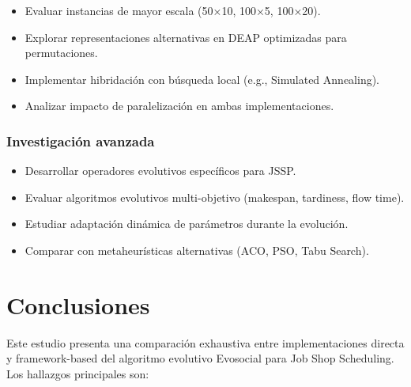 \documentclass[12pt,a4paper]{article}
\begin{document}
\begin{itemize}
    \item Evaluar instancias de mayor escala (50×10, 100×5, 100×20).
    \item Explorar representaciones alternativas en DEAP optimizadas para permutaciones.
    \item Implementar hibridación con búsqueda local (e.g., Simulated Annealing).
    \item Analizar impacto de paralelización en ambas implementaciones.
\end{itemize}

\subsubsection{Investigación avanzada}

\begin{itemize}
    \item Desarrollar operadores evolutivos específicos para JSSP.
    \item Evaluar algoritmos evolutivos multi-objetivo (makespan, tardiness, flow time).
    \item Estudiar adaptación dinámica de parámetros durante la evolución.
    \item Comparar con metaheurísticas alternativas (ACO, PSO, Tabu Search).
\end{itemize}

\section{Conclusiones}

Este estudio presenta una comparación exhaustiva entre implementaciones directa y framework-based del algoritmo evolutivo Evosocial para Job Shop Scheduling. Los hallazgos principales son:
\end{document}
